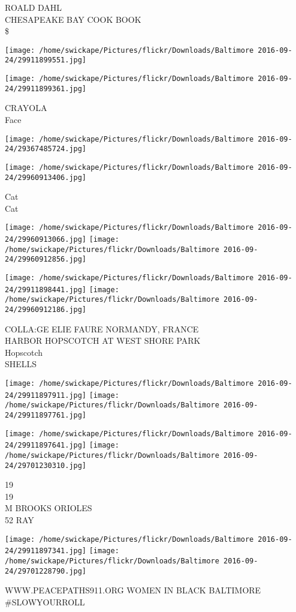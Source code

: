 \documentclass[10pt,letterpaper]{article}
\begin{document}
ROALD DAHL\\
CHESAPEAKE BAY COOK BOOK\\
\$
\pagebreak

\texttt{[image: /home/swickape/Pictures/flickr/Downloads/Baltimore 2016-09-24/29911899551.jpg]}

\vspace{0.25in}
\texttt{[image: /home/swickape/Pictures/flickr/Downloads/Baltimore 2016-09-24/29911899361.jpg]}

CRAYOLA\\
Face
\pagebreak

\texttt{[image: /home/swickape/Pictures/flickr/Downloads/Baltimore 2016-09-24/29367485724.jpg]}

\vspace{0.25in}
\texttt{[image: /home/swickape/Pictures/flickr/Downloads/Baltimore 2016-09-24/29960913406.jpg]}

Cat\\
Cat
\pagebreak

\texttt{[image: /home/swickape/Pictures/flickr/Downloads/Baltimore 2016-09-24/29960913066.jpg]}
\texttt{[image: /home/swickape/Pictures/flickr/Downloads/Baltimore 2016-09-24/29960912856.jpg]}

\texttt{[image: /home/swickape/Pictures/flickr/Downloads/Baltimore 2016-09-24/29911898441.jpg]}
\texttt{[image: /home/swickape/Pictures/flickr/Downloads/Baltimore 2016-09-24/29960912186.jpg]}

COLLA:GE ELIE FAURE NORMANDY, FRANCE\\
HARBOR HOPSCOTCH AT WEST SHORE PARK\\
Hopscotch\\
SHELLS
\pagebreak

\texttt{[image: /home/swickape/Pictures/flickr/Downloads/Baltimore 2016-09-24/29911897911.jpg]}
\texttt{[image: /home/swickape/Pictures/flickr/Downloads/Baltimore 2016-09-24/29911897761.jpg]}

\texttt{[image: /home/swickape/Pictures/flickr/Downloads/Baltimore 2016-09-24/29911897641.jpg]}
\texttt{[image: /home/swickape/Pictures/flickr/Downloads/Baltimore 2016-09-24/29701230310.jpg]}

19\\
19\\
M BROOKS ORIOLES\\
52 RAY
\pagebreak

\texttt{[image: /home/swickape/Pictures/flickr/Downloads/Baltimore 2016-09-24/29911897341.jpg]}
\texttt{[image: /home/swickape/Pictures/flickr/Downloads/Baltimore 2016-09-24/29701228790.jpg]}

WWW.PEACEPATHS911.ORG WOMEN IN BLACK BALTIMORE\\
\#SLOWYOURROLL
\pagebreak
\end{document}
